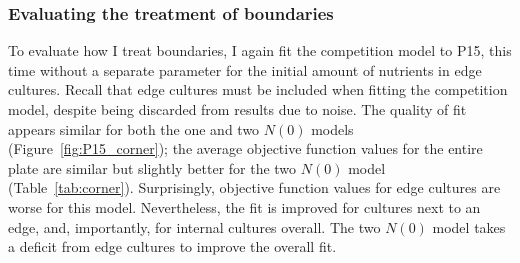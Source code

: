 \begin{multicols}{2}


\subsubsection{Evaluating the treatment of boundaries}
\label{sec:treatment_of_boundaries}

To evaluate how I treat boundaries, I again fit the competition model
to P15, this time without a separate parameter for the initial amount
of nutrients in edge cultures. Recall that edge cultures must be
included when fitting the competition model, despite being discarded
from results due to noise. The quality of fit appears similar for both
the one and two \(N(0)\) models (Figure~\ref{fig:P15_corner}); the
average objective function values for the entire plate are similar but
slightly better for the two \(N(0)\) model
(Table~\ref{tab:corner}). Surprisingly, objective function values for
edge cultures are worse for this model. Nevertheless, the fit is
improved for cultures next to an edge, and, importantly, for internal
cultures overall. The two \(N(0)\) model takes a deficit from edge
cultures to improve the overall fit.


\end{multicols}
